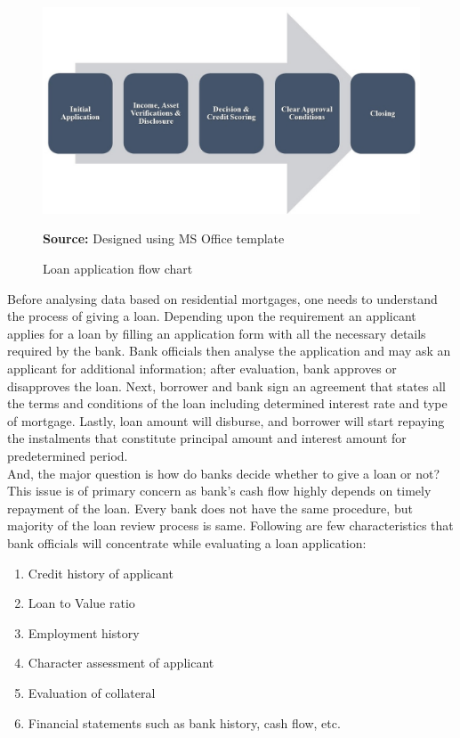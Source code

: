 {\begin{figure}
\includegraphics[width=\textwidth]{Loanflowchart.jpg}
\centering
\caption{Loan application flow chart}{\textbf{Source:} Designed using MS Office template}
\label{fig:loanflowchart}
\end{figure}

Before analysing data based on residential mortgages, one needs to understand the process of giving a loan. Depending upon the requirement an applicant applies for a loan by filling an application form with all the necessary details required by the bank. Bank officials then analyse the application and may ask an applicant for additional information; after evaluation, bank approves or disapproves the loan. Next, borrower and bank sign an agreement that states all the terms and conditions of the loan including determined interest rate and type of mortgage. Lastly, loan amount will disburse, and borrower will start repaying the instalments that constitute principal amount and interest amount for predetermined period.\\

And, the major question is how do banks decide whether to give a loan or not? This issue is of primary concern as bank's cash flow highly depends on timely repayment of the loan. Every bank does not have the same procedure, but majority of the loan review process is same. Following are few characteristics that bank officials will concentrate while evaluating a loan application:
\begin{enumerate}
    \item Credit history of applicant
    \item Loan to Value ratio
    \item Employment history
    \item Character assessment of applicant
    \item Evaluation of collateral
    \item Financial statements such as bank history, cash flow, etc. 
\end{enumerate}

}
